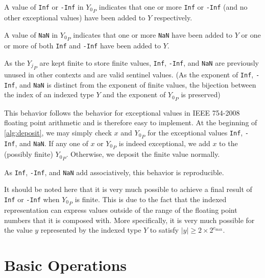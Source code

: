 \documentclass[12pt]{article}
\providecommand{\max}{\ensuremath{\text{max}}}
\theoremstyle{plain}
\begin{document}
      A value of \verb|Inf| or \verb|-Inf| in ${Y_0}_P$ indicates that one or more \verb|Inf| or \verb|-Inf| (and no other exceptional values) have been added to $Y$ respectively.

      A value of \verb|NaN| in ${Y_0}_P$ indicates that one or more \verb|NaN| have been added to $Y$ or one or more of both \verb|Inf| and \verb|-Inf| have been added to $Y$.

      As the ${Y_j}_P$ are kept finite to store finite values, \verb|Inf|, \verb|-Inf|, and \verb|NaN| are previously unused in other contexts and are valid sentinel values. (As the exponent of \verb|Inf|, \verb|-Inf|, and \verb|NaN| is distinct from the exponent of finite values, the bijection between the index of an indexed type $Y$ and the exponent of ${Y_0}_P$ is preserved)

      This behavior follows the behavior for exceptional values in IEEE 754-2008 floating point arithmetic and is therefore easy to implement. At the beginning of \ref{alg:deposit}, we may simply check $x$ and ${Y_0}_P$ for the exceptional values \verb|Inf|, \verb|-Inf|, and \verb|NaN|. If any one of $x$ or ${Y_0}_P$ is indeed exceptional, we add $x$ to the (possibly finite) ${Y_0}_P$. Otherwise, we deposit the finite value normally.

      As \verb|Inf|, \verb|-Inf|, and \verb|NaN| add associatively, this behavior is reproducible.

      It should be noted here that it is very much possible to achieve a final result of \verb|Inf| or \verb|-Inf| when ${Y_0}_P$ is finite. This is due to the fact that the indexed representation can express values outside of the range of the floating point numbers that it is composed with. More specifically, it is very much possible for the value $y$ represented by the indexed type $Y$ to satisfy $|y| \geq 2 \times 2^{e_{\max}}$.

\section{Basic Operations}
\end{document}
